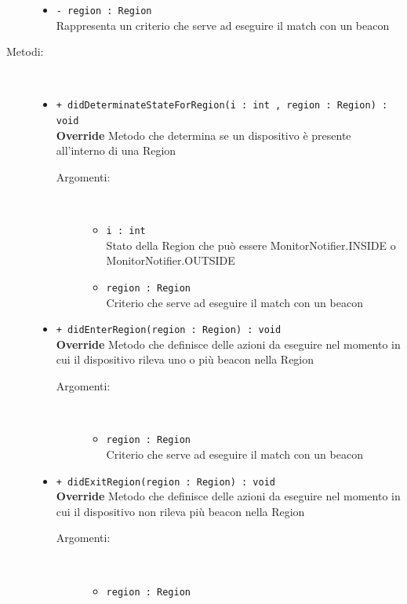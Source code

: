 \documentclass[../DefinizioneDiProdotto.tex]{subfiles}
\begin{document}
\begin{description}
\begin{itemize}
		\item \texttt{- region : Region}\\
		Rappresenta un criterio che serve ad eseguire il match con un beacon
		
	\end{itemize}
	\item[Metodi:] \
	\begin{itemize}
		\item \texttt{+ didDeterminateStateForRegion(i : int , region : Region) : void}\\
		\textbf{Override} Metodo che determina se un dispositivo è presente all'interno di una Region
		\begin{description}
			\item[Argomenti:] \
			\begin{itemize}
				\item \texttt{i : int }\\
				Stato della Region che può essere MonitorNotifier.INSIDE o MonitorNotifier.OUTSIDE\item \texttt{region : Region}\\
				Criterio che serve ad eseguire il match con un beacon\end{itemize}
		\end{description}
		\item \texttt{+ didEnterRegion(region : Region) : void}\\
		\textbf{Override} Metodo che definisce delle azioni da eseguire nel momento in cui il dispositivo rileva uno o più beacon nella Region
		\begin{description}
			\item[Argomenti:] \
			\begin{itemize}
				\item \texttt{region : Region}\\
				Criterio che serve ad eseguire il match con un beacon\end{itemize}
		\end{description}
		\item \texttt{+ didExitRegion(region : Region) : void}\\
		\textbf{Override} Metodo che definisce delle azioni da eseguire nel momento in cui il dispositivo non rileva più beacon nella Region
		\begin{description}
			\item[Argomenti:] \
			\begin{itemize}
				\item \texttt{region : Region}\\

\end{itemize}
\end{description}
\end{itemize}
\end{description}
\end{document}
